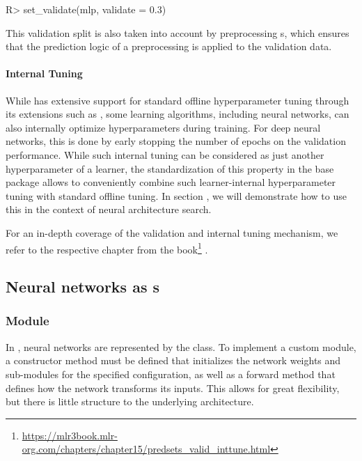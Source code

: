 \documentclass[article]{jss}
\theoremstyle{definition}
\begin{document}
\begin{CodeInput}
R> set_validate(mlp, validate = 0.3)
\end{CodeInput}

This validation split is also taken into account by preprocessing s, which ensures that the prediction logic of a preprocessing  is applied to the validation data.

\paragraph{Internal Tuning}

While \mlrt{} has extensive support for standard offline hyperparameter tuning through its extensions such as  \citep{ref-mlr3tuning2024}, some learning algorithms, including neural networks, can also internally optimize hyperparameters during training.
For deep neural networks, this is done by early stopping the number of epochs on the validation performance.
While such internal tuning can be considered as just another hyperparameter of a learner, the standardization of this property in the \mlrt{} base package allows to conveniently combine such learner-internal hyperparameter tuning with standard offline tuning.
In section , we will demonstrate how to use this in the context of neural architecture search.

For an in-depth coverage of the validation and internal tuning mechanism, we refer to the respective chapter from the  book\footnote{\url{https://mlr3book.mlr-org.com/chapters/chapter15/predsets\_valid\_inttune.html}} \citep{ref-mlr3book-valid}.

\subsection[Neural networks as Graphs]{Neural networks as s}

\subsubsection[Module Graph]{Module }

In , neural networks are represented by the  class.
To implement a custom module, a constructor method must be defined that initializes the network weights and sub-modules for the specified configuration, as well as a forward method that defines how the network transforms its inputs.
This allows for great flexibility, but there is little structure to the underlying architecture.
\end{document}
